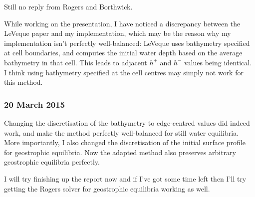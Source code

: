 \documentclass[a4paper,onecolumn,11pt]{report}
\begin{document}
Still no reply from Rogers and Borthwick.

While working on the presentation, I have noticed a discrepancy between the LeVeque paper and my implementation, which may be the reason why my implementation isn't perfectly well-balanced: LeVeque uses bathymetry specified at cell boundaries, and computes the initial water depth based on the average bathymetry in that cell. This leads to adjacent $h^+$ and $h^-$ values being identical. I think using bathymetry specified at the cell centres may simply not work for this method.

\subsubsection*{20 March 2015}

Changing the discretisation of the bathymetry to edge-centred values did indeed work, and make the method perfectly well-balanced for still water equilibria. More importantly, I also changed the discretisation of the initial surface profile for geostrophic equilibria. Now the adapted method also preserves arbitrary geostrophic equilibria perfectly.

I will try finishing up the report now and if I've got some time left then I'll try getting the Rogers solver for geostrophic equilibria working as well.



\end{document}
